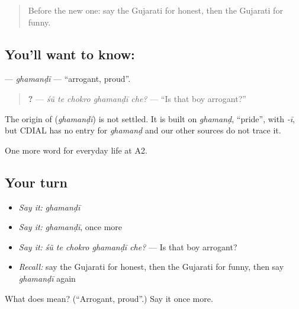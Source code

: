 \label{lesson:GU-C270-ghamandi}



\begin{quote}
Before the new one: say the Gujarati for honest, then the Gujarati for funny.
\end{quote}

\subsection*{You'll want to know: }
\textbf{} — \emph{ghamanḍī} — \textquotedblleft{}arrogant, proud\textquotedblright{}.

\begin{quote}
\textbf{    ?} — \emph{śũ te chokro ghamanḍī che?} — \textquotedblleft{}Is that boy arrogant?\textquotedblright{}
\end{quote}

\begin{cousinweb}
The origin of \textbf{} (\emph{ghamanḍī}) is not settled. It is built on \emph{ghamanḍ}, \textquotedblleft{}pride\textquotedblright{}, with \emph{-ī}, but CDIAL has no entry for \emph{ghamanḍ} and our other sources do not trace it.
\end{cousinweb}

\begin{grammarlens}[title={What you've built}]
One more word for everyday life at A2.
\end{grammarlens}

\subsection*{Your turn}
\begin{itemize}
\raggedright
  \item \emph{Say it:} \emph{ghamanḍī}
  \item \emph{Say it:} \emph{ghamanḍī}, once more
  \item \emph{Say it:} \emph{śũ te chokro ghamanḍī che?} — Is that boy arrogant?
  \item \emph{Recall:} say the Gujarati for honest, then the Gujarati for funny, then say \emph{ghamanḍī} again
\end{itemize}

\begin{tcolorbox}[breakable,colback=teal!4,colframe=teal!35!black,title={Before you move on}]
What does  mean? (\textquotedblleft{}Arrogant, proud\textquotedblright{}.) Say it once more.
\end{tcolorbox}
